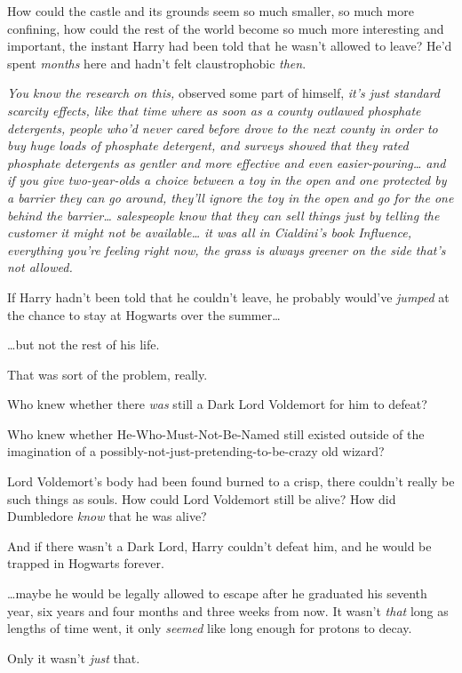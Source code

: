 How could the castle and its grounds seem so much smaller, so much more confining, how could the rest of the world become so much more interesting and important, the instant Harry had been told that he wasn't allowed to leave? He'd spent \emph{months} here and hadn't felt claustrophobic \emph{then}.

\emph{You \emph{know} the research on this,} observed some part of himself, \emph{it's just standard scarcity effects, like that time where as soon as a county outlawed phosphate detergents, people who'd never cared before drove to the next county in order to buy huge loads of phosphate detergent, and surveys showed that they rated phosphate detergents as gentler and more effective and even easier-pouring{\ldots} and if you give two-year-olds a choice between a toy in the open and one protected by a barrier they can go around, they'll ignore the toy in the open and go for the one behind the barrier{\ldots} salespeople know that they can sell things just by telling the customer it might not be available{\ldots} it was all in Cialdini's book \emph{Influence}, everything you're feeling right now, the grass is always greener on the side that's not allowed.}

If Harry hadn't been told that he couldn't leave, he probably would've \emph{jumped} at the chance to stay at Hogwarts over the summer{\ldots}

{\ldots}but not the rest of his life.

That was sort of the problem, really.

Who knew whether there \emph{was} still a Dark Lord Voldemort for him to defeat?

Who knew whether He-Who-Must-Not-Be-Named still existed outside of the imagination of a possibly-not-just-pretending-to-be-crazy old wizard?

Lord Voldemort's body had been found burned to a crisp, there couldn't really be such things as souls. How could Lord Voldemort still be alive? How did Dumbledore \emph{know} that he was alive?

And if there wasn't a Dark Lord, Harry couldn't defeat him, and he would be trapped in Hogwarts forever.

{\ldots}maybe he would be legally allowed to escape after he graduated his seventh year, six years and four months and three weeks from now. It wasn't \emph{that} long as lengths of time went, it only \emph{seemed} like long enough for protons to decay.

Only it wasn't \emph{just} that.

